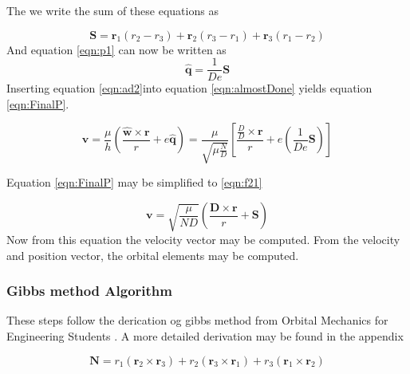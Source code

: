\documentclass[12pt]{article}
\begin{document}

The we write the sum of these equations as 

	\begin{equation}
	\mathbf { S } = \mathbf { r } _ { 1 } \left( r _ { 2 } - r _ { 3 } \right) + \mathbf { r } _ { 2 } \left( r _ { 3 } - r _ { 1 } \right) + \mathbf { r } _ { 3 } \left( r _ { 1 } - r _ { 2 } \right)
	\end{equation}
	And equation \ref{eqn:p1} can now be written as 
	\begin{equation}
	\hat { \mathbf { q } } = \frac { 1 } { D e } \mathbf { S }
	\label{eqn:ad2}
	\end{equation}
	Inserting equation \ref{eqn:ad2}into equation \ref{eqn:almostDone} yields equation \ref{eqn:FinalP}. 
		
	\begin{equation}
	\mathbf { v } = \frac { \mu } { h } \left( \frac { \hat { \mathbf { w } } \times \mathbf { r } } { r } + e \hat { \mathbf { q } } \right)=\frac { \mu } { \sqrt { \mu \frac { N } { D } } } \left[ \frac { \frac { D } { D } \times \mathbf { r } } { r } + e \left( \frac { 1 } { D e } \mathbf { S } \right) \right]
	\label{eqn:FinalP}
	\end{equation}
	
	Equation \ref{eqn:FinalP} may be simplified to \ref{eqn:f21}
	
	\begin{equation}
	\mathbf { v } = \sqrt { \frac { \mu } { N D } } \left( \frac { \mathbf { D } \times \mathbf { r } } { r } + \mathbf { S } \right)
	\label{eqn:f21}
	\end{equation}
	 Now from this equation the velocity vector may be computed. From the velocity and position vector, the orbital elements may be computed. 
	\iffalse
	\subsubsection{Gibbs method Algorithm}
	These steps follow the derication og gibbs method from Orbital Mechanics for Engineering Students \cite{curtis2013_gibbs}. A more detailed derivation may be found in the appendix
	
	\begin{equation}
	\mathbf { N } = r _ { 1 } \left( \mathbf { r } _ { 2 } \times \mathbf { r } _ { 3 } \right) + r _ { 2 } \left( \mathbf { r } _ { 3 } \times \mathbf { r } _ { 1 } \right) + r _ { 3 } \left( \mathbf { r } _ { 1 } \times \mathbf { r } _ { 2 } \right)
	\end{equation}
	
\end{document}

